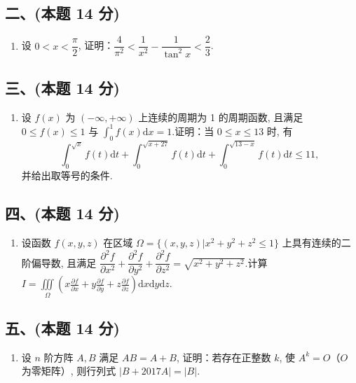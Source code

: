\subsection*{二、(本题 14 分)}
\begin{enumerate}[start=6]
    \item 设 $0 < x < \dfrac{\pi}{2}$, 证明：$\dfrac{4}{\pi^2} < \dfrac{1}{x^2} - \dfrac{1}{\tan^2 x} < \dfrac{2}{3}$.
\end{enumerate}

\subsection*{三、(本题 14 分)}
\begin{enumerate}[start=7]
    \item 设 $f(x)$ 为 $(-\infty, +\infty)$ 上连续的周期为 1 的周期函数, 且满足 $0 \leqslant f(x) \leqslant 1$ 与 $\displaystyle\int_{0}^{1} f(x) \mathrm{d}x = 1$.证明：当 $0 \leqslant x \leqslant 13$ 时, 有
          \[
              \int_{0}^{\sqrt{x}} f(t) \mathrm{d}t + \int_{0}^{\sqrt{x+27}} f(t) \mathrm{d}t + \int_{0}^{\sqrt{13-x}} f(t) \mathrm{d}t \leqslant 11,
          \]
          并给出取等号的条件.
\end{enumerate}

\subsection*{四、(本题 14 分)}
\begin{enumerate}[start=8]
    \item 设函数 $f(x, y, z)$ 在区域 $\Omega = \{(x, y, z) | x^2 + y^2 + z^2 \leqslant 1\}$ 上具有连续的二阶偏导数, 且满足 $\dfrac{\partial^2 f}{\partial x^2} + \dfrac{\partial^2 f}{\partial y^2} + \dfrac{\partial^2 f}{\partial z^2} = \sqrt{x^2 + y^2 + z^2}$.计算 $I = \displaystyle\iiint\limits_{\Omega} \left( x \frac{\partial f}{\partial x} + y \frac{\partial f}{\partial y} + z \frac{\partial f}{\partial z} \right) \mathrm{d}x \mathrm{d}y \mathrm{d}z$.
\end{enumerate}

\subsection*{五、(本题 14 分)}
\begin{enumerate}[start=9]
    \item 设 $n$ 阶方阵 $A, B$ 满足 $AB = A + B$, 证明：若存在正整数 $k$, 使 $A^k = O$（$O$ 为零矩阵）, 则行列式 $|B + 2017A| = |B|$.
\end{enumerate}


